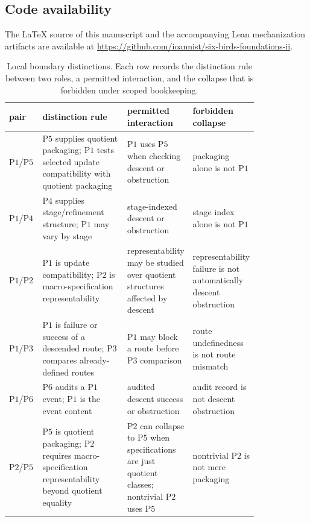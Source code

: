 \documentclass[11pt]{article}
\theoremstyle{definition}
\newcommand{\Pone}{\ensuremath{\mathrm{P1}}}
\newcommand{\Ptwo}{\ensuremath{\mathrm{P2}}}
\newcommand{\Pthree}{\ensuremath{\mathrm{P3}}}
\newcommand{\Pfour}{\ensuremath{\mathrm{P4}}}
\newcommand{\Pfive}{\ensuremath{\mathrm{P5}}}
\newcommand{\Psix}{\ensuremath{\mathrm{P6}}}
\begin{document}
\subsection{Code availability}\label{app:code-availability}

The \LaTeX{} source of this manuscript and the accompanying Lean
mechanization artifacts are available at
\url{https://github.com/ioannist/six-birds-foundations-ii}.
 


\begin{landscape}
\begin{table}
\caption{Local boundary distinctions. Each row records the distinction
rule between two roles, a permitted interaction, and the collapse that
is forbidden under scoped bookkeeping.}
\label{tab:boundary-matrix}
\centering
\footnotesize
\renewcommand{\arraystretch}{1.15}
\begin{tabular}{@{}lp{0.34\linewidth}p{0.24\linewidth}p{0.24\linewidth}@{}}
\toprule
pair & distinction rule & permitted interaction & forbidden collapse \\
\midrule
\Pone{}/\Pfive{} & \Pfive{} supplies quotient packaging; \Pone{} tests selected update compatibility with quotient packaging & \Pone{} uses \Pfive{} when checking descent or obstruction & packaging alone is not \Pone{} \\
\Pone{}/\Pfour{} & \Pfour{} supplies stage/refinement structure; \Pone{} may vary by stage & stage-indexed descent or obstruction & stage index alone is not \Pone{} \\
\Pone{}/\Ptwo{} & \Pone{} is update compatibility; \Ptwo{} is macro-specification representability & representability may be studied over quotient structures affected by descent & representability failure is not automatically descent obstruction \\
\Pone{}/\Pthree{} & \Pone{} is failure or success of a descended route; \Pthree{} compares already-defined routes & \Pone{} may block a route before \Pthree{} comparison & route undefinedness is not route mismatch \\
\Pone{}/\Psix{} & \Psix{} audits a \Pone{} event; \Pone{} is the event content & audited descent success or obstruction & audit record is not descent obstruction \\
\Ptwo{}/\Pfive{} & \Pfive{} is quotient packaging; \Ptwo{} requires macro-specification representability beyond quotient equality & \Ptwo{} can collapse to \Pfive{} when specifications are just quotient classes; nontrivial \Ptwo{} uses \Pfive{} & nontrivial \Ptwo{} is not mere packaging \\

\end{tabular}
\end{table}
\end{landscape}
\end{document}
